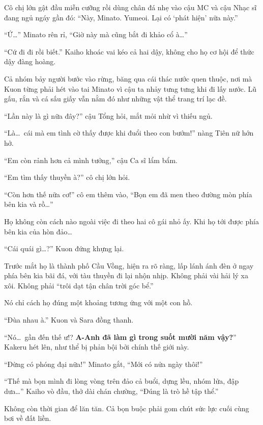 \documentclass[../main.tex]{subfiles}
\begin{document}
Cô chị lớn gật đầu miễn cưỡng rồi dùng chân đá nhẹ vào cậu MC và cậu Nhạc sĩ đang ngủ ngáy gần đó: ``Này, Minato. Yumeoi. Lại có `phát hiện' nữa này.''

``Ứ\dots'' Minato rên rỉ, ``Giờ này mà cũng bắt đi khảo cổ à\dots''

``Cứ đi đi rồi biết.'' Kaiho khoác vai kéo cả hai dậy, không cho họ cơ hội để thức dậy đàng hoàng.


Cả nhóm bảy người bước vào rừng, băng qua cái thác nước quen thuộc, nơi mà Kuon từng phải hét vào tai Minato vì cậu ta nhảy tưng tưng khi đi lấy nước. Lũ gấu, rắn và cá sấu giấy vẫn nằm đó như những vật thể trang trí lạc đề.

``Lần này là gì nữa đây?'' cậu Tổng hỏi, mắt mỏi nhừ vì thiếu ngủ.

``Là\dots\ cái mà em tình cờ thấy được khi đuổi theo con bướm!'' nàng Tiên nữ hớn hở.

``Em còn rảnh hơn cả mình tưởng,'' cậu Ca sĩ lẩm bẩm.

``Em tìm thấy thuyền à?'' cô chị lớn hỏi.

``Còn hơn thế nữa cơ!'' cô em thêm vào, ``Bọn em đã men theo đường mòn phía bên kia và rồ\dots''

Họ không còn cách nào ngoài việc đi theo hai cô gái nhỏ ấy. Khi họ tới được phía bên kia của hòn đảo\dots

``Cái quái gì\dots?'' Kuon đứng khựng lại.

Trước mắt họ là thành phố Cầu Vồng, hiện ra rõ ràng, lấp lánh ánh đèn ở ngay phía bên kia bãi đá, với tàu thuyền đi lại nhộn nhịp. Không phải vài hải lý xa xôi. Không phải ``trôi dạt tận chân trời góc bể.''

Nó chỉ cách họ đúng một khoảng tương ứng với một con hồ.


``Đùa nhau à.'' Kuon và Sara đồng thanh.

``Nó\dots\ gần đến thế ư!? \textbf{A-Anh đã làm gì trong suốt mười năm vậy?}'' Kakeru hét lên, như thể bị phản bội bởi chính thế giới này.

``Đừng có phóng đại nữa!'' Minato gắt, ``Mới có nửa ngày thôi!''

``Thế mà bọn mình đi lòng vòng trên đảo cả buổi, dựng lều, nhóm lửa, đập dưa\dots'' Kaiho vò đầu, thở dài chán chường, ``Đúng là trò hề tập thể.''

Không còn thời gian để lăn tăn. Cả bọn buộc phải gom chút sức lực cuối cùng bơi về đất liền.
\end{document}
